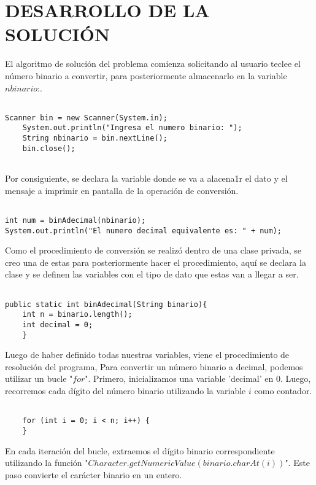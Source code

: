 \documentclass{IEEEcsmag}
\begin{document}
\section{DESARROLLO DE LA SOLUCIÓN}
El algoritmo de solución del problema comienza solicitando al usuario teclee el número binario a convertir, para posteriormente almacenarlo en la variable $nbinario$:.
\begin{lstlisting}[style=javaStyle]

Scanner bin = new Scanner(System.in);
    System.out.println("Ingresa el numero binario: ");
    String nbinario = bin.nextLine();
    bin.close();
        
\end{lstlisting}

Por consiguiente, se declara la variable donde se va a alacena1r el dato y el mensaje a imprimir en pantalla de la operación de conversión.

\begin{lstlisting}[style=javaStyle]

int num = binAdecimal(nbinario);
System.out.println("El numero decimal equivalente es: " + num);

\end{lstlisting}

Como el procedimiento de conversión se realizó dentro de una clase privada, se creo una de estas para posteriormente hacer el procedimiento, aquí se declara la clase y se definen las variables con el tipo de dato que estas van a llegar a ser.

\begin{lstlisting}[style=javaStyle]

public static int binAdecimal(String binario){
    int n = binario.length();
    int decimal = 0;
    }

\end{lstlisting}

Luego de haber definido todas nuestras variables, viene el procedimiento de resolución del programa, Para convertir un número binario a decimal, podemos utilizar un bucle "$for$". Primero, inicializamos una variable 'decimal' en 0. Luego, recorremos cada dígito del número binario utilizando la variable $i$ como contador.

\begin{lstlisting}[style=javaStyle]

    for (int i = 0; i < n; i++) {
    }
\end{lstlisting}

En cada iteración del bucle, extraemos el dígito binario correspondiente utilizando la función "$Character.getNumericValue(binario.charAt(i))$". Este paso convierte el carácter binario en un entero.
\end{document}
